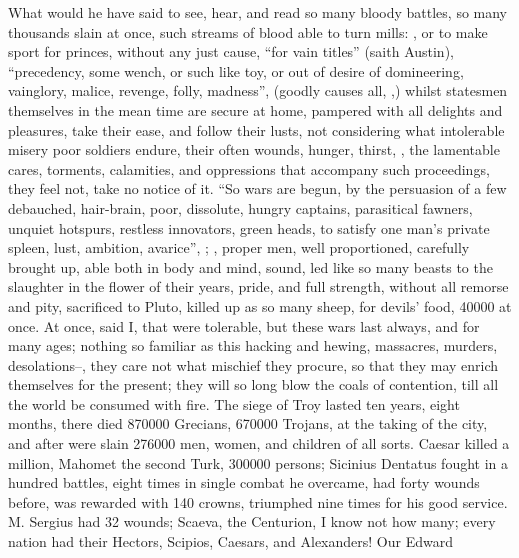 What would he have said to see, hear, and read so many bloody battles, so many
thousands slain at once, such streams of blood able to turn mills: , or to make sport for princes, without any just cause,
\enquote{for vain titles} (saith Austin), \enquote{precedency, some wench,
or such like toy, or out of desire of domineering, vainglory, malice, revenge,
folly, madness}, (goodly causes all, ,) whilst statesmen themselves in the mean time are secure
at home, pampered with all delights and pleasures, take their ease, and follow
their lusts, not considering what intolerable misery poor soldiers endure,
their often wounds, hunger, thirst, \etc{}, the lamentable cares, torments,
calamities, and oppressions that accompany such proceedings, they feel not,
take no notice of it. \enquote{So wars are begun, by the persuasion of a few debauched,
hair-brain, poor, dissolute, hungry captains, parasitical fawners, unquiet
hotspurs, restless innovators, green heads, to satisfy one man's private
spleen, lust, ambition, avarice}, \etc{}; , proper men, well proportioned, carefully brought
up, able both in body and mind, sound, led like so many
beasts to the slaughter in the flower of their years,
pride, and full strength, without all remorse and pity, sacrificed to Pluto,
killed up as so many sheep, for devils' food, 40\thinspace{}000 at once. At
once, said I, that were tolerable, but these wars last always, and for many
ages; nothing so familiar as this hacking and hewing, massacres, murders,
desolations--, they care not what mischief
they procure, so that they may enrich themselves for the present; they will so
long blow the coals of contention, till all the world be consumed with fire.
The siege of Troy lasted ten years, eight months, there
died 870\thinspace{}000 Grecians, 670\thinspace{}000 Trojans, at the taking of
the city, and after were slain 276\thinspace{}000 men, women, and children of
all sorts. Caesar killed a million, Mahomet the second
Turk, 300\thinspace{}000 persons; Sicinius Dentatus fought in a hundred
battles, eight times in single combat he overcame, had forty wounds before, was
rewarded with 140 crowns, triumphed nine times for his good service. M. Sergius
had 32 wounds; Scaeva, the Centurion, I know not how many; every nation had
their Hectors, Scipios, Caesars, and Alexanders! Our Edward

